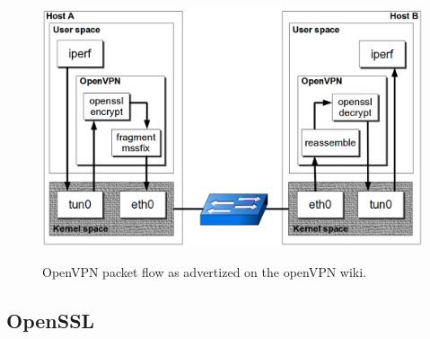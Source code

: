 \begin{figure}[ht]
\includegraphics[width=\textwidth]{OpenVPN-packetflow}
\caption{OpenVPN packet flow as advertized on the openVPN wiki.}{}
\label{fig:openvpn-packet-flow}
\end{figure}

\subsection{OpenSSL}


